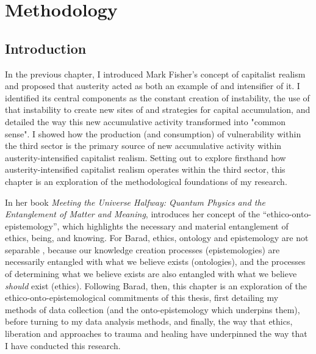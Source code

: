 \chapter{Methodology}
\label{ch:3}
\section{Introduction}
\label{sec:3-1-intro}


In the previous chapter, I introduced Mark Fisher’s concept of capitalist realism and proposed that austerity acted as both an example of and intensifier of it. I identified its central components as the constant creation of instability, the use of that instability to create new sites of and strategies for capital accumulation, and detailed the way this new accumulative activity transformed into "common sense". I showed how the production (and consumption) of vulnerability within the third sector is the primary source of new accumulative activity within austerity-intensified capitalist realism. Setting out to explore firsthand how austerity-intensified capitalist realism operates within the third sector, this chapter is an exploration of the methodological foundations of my research. 

In her  book \emph{Meeting the Universe Halfway: Quantum Physics and the Entanglement of Matter and Meaning}, \citet{barad_meeting_2007} introduces her concept of the “ethico-onto-epistemology”, which highlights the necessary and material entanglement of ethics, being, and knowing. For Barad, ethics, ontology and epistemology are not separable \citep[90]{barad_meeting_2007}, because our knowledge creation processes (epistemologies) are necessarily entangled with what we believe exists (ontologies), and the processes of determining what we believe exists are also entangled with what we believe \textit{should} exist (ethics). Following Barad, then, this chapter is an exploration of the ethico-onto-epistemological commitments of this thesis, first detailing my methods of data collection (and the onto-epistemology which underpins them), before turning to my data analysis methods, and finally, the way that ethics, liberation and approaches to trauma and healing have underpinned the way that I have conducted this research.

